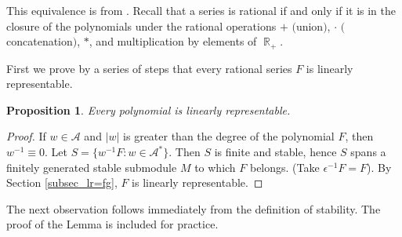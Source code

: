 \documentclass{kepart2010}
\theoremstyle{plain}
\newtheorem{prop}[thm]{Proposition}
\theoremstyle{definition}
\theoremstyle{remark}
\theoremstyle{definition}
\numberwithin{equation}{section}
\begin{document}
This equivalence is from \cite{Kleene1956, Schutzenberger1961}.
Recall that a series is rational if and only if it is in the closure
of the polynomials under the rational operations $+$ $($union$)$,
$\cdot$ $($concatenation$)$, $*$, and multiplication by elements of
$\operatorname{\mathbb R}_{+}$.

First we prove by a series of steps that every rational series $F$
is linearly representable.
\begin{prop}
Every polynomial is linearly representable.
\end{prop}
\begin{proof}
If $w \in {{\mathcal A}}$ and $|w|$ is greater than the degree of the
polynomial $F$, then $w^{-1}\equiv 0$.  Let $S=\{w^{-1}F: w\in
{{\mathcal A}}^{*}\}.$ Then $S$ is finite and stable, hence $S$ spans a
finitely generated stable submodule $M$ to which $F$ belongs.  (Take
${\epsilon}^{-1}F=F$). By Section \ref{subsec_lr=fg}, $F$ is
linearly representable.
\end{proof}
The next observation follows immediately from the definition of
stability. {The proof of the Lemma is included for practice.}
\end{document}
